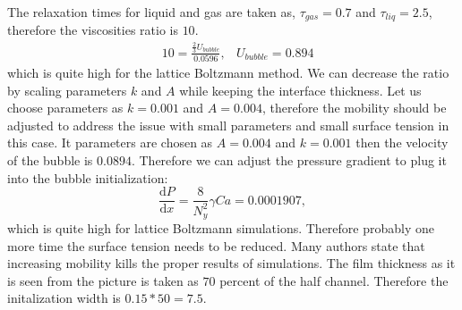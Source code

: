 \documentclass{article}
\begin{document}
The relaxation times for liquid and gas are taken as, $\tau_{gas}=0.7$ and $\tau_{liq}=2.5$,
therefore the viscosities ratio is $10$.
\begin{equation}
\begin{aligned}
&10=\frac{\frac{2}{3} U_{bubble}}{0.0596},
&U_{bubble}=0.894
\end{aligned}
\end{equation}
which is quite high for the lattice Boltzmann method. We can decrease the ratio by scaling
parameters $k$ and $A$ while keeping the interface thickness. Let us choose parameters as $k=0.001$
and $A=0.004$, therefore the mobility should be adjusted to address the issue with small parameters
and small surface tension in this case. It parameters are chosen as $A=0.004$ and $k=0.001$ then
the velocity of the bubble is  $0.0894$. Therefore we can adjust the pressure gradient to plug it
into the bubble initialization:
\begin{equation}
\frac{\mathrm{d}P}{\mathrm{d}x}=\frac{8}{N_y^2} \gamma Ca=0.0001907,
\end{equation}
which is quite high for lattice Boltzmann simulations. Therefore probably one more time the surface
tension needs to be reduced. {\color{red} Many authors state that increasing mobility kills the
proper results of simulations}. 
The film thickness as it is seen from the picture is taken as $70$ percent of the half channel.
Therefore the initalization width is $0.15*50=7.5$. 
\end{document}
